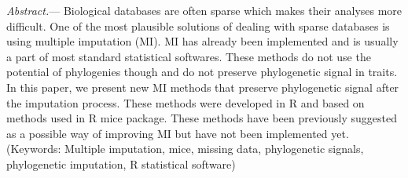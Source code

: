 \documentclass[hidelinks,a4paper]{article}
\renewcommand{\subsubsection}[1]{%
\vspace{2ex}
\noindent
\textit{#1.}---}
\begin{document}
\subsubsection{Abstract}
Biological databases are often sparse which makes their analyses more difficult. One of the most plausible solutions of dealing with sparse databases is using multiple imputation (MI). MI has already been implemented and is usually a part of most standard statistical softwares. These methods do not use the potential of phylogenies though and do not preserve phylogenetic signal in traits. In this paper, we present new MI methods that preserve phylogenetic signal after the imputation process. These methods were developed in R and based on methods used in R mice package. These methods have been previously suggested as a possible way of improving MI but have not been implemented yet.
\\
\noindent (Keywords: Multiple imputation, mice, missing data, phylogenetic signals, phylogenetic imputation, R statistical software)\\
\newpage
\end{document}
